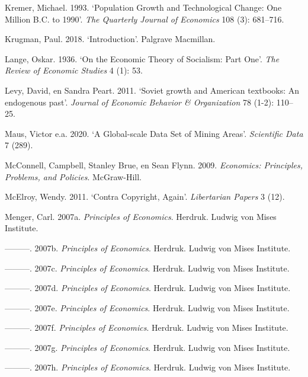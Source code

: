 \documentclass[
  a5paper,
  smalldemyvopaper,11pt,twoside,onecolumn,openright,extrafontsizes,
hidelinks]{memoir}
\newlength{\cslhangindent}
\newenvironment{CSLReferences}[2] %
 {\begin{list}{}{%
  \setlength{\itemindent}{0pt}
  \setlength{\leftmargin}{0pt}
  \setlength{\parsep}{0pt}
  \ifodd #1
   \setlength{\leftmargin}{\cslhangindent}
   \setlength{\itemindent}{-1\cslhangindent}
  \fi
  \setlength{\itemsep}{#2\baselineskip}}}
 {\end{list}}
\begin{document}
\begin{CSLReferences}{1}{0}
Kremer, Michael. 1993. {`Population Growth and Technological Change: One
Million B.C. to 1990'}. \emph{The Quarterly Journal of Economics} 108
(3): 681--716.

Krugman, Paul. 2018. {`Introduction'}. Palgrave Macmillan.

Lange, Oskar. 1936. {`On the Economic Theory of Socialism: Part One'}.
\emph{The Review of Economic Studies} 4 (1): 53.

Levy, David, en Sandra Peart. 2011. {`Soviet growth and American
textbooks: An endogenous past'}. \emph{Journal of Economic Behavior \&
Organization} 78 (1-2): 110--25.

Maus, Victor e.a. 2020. {`A Global-scale Data Set of Mining Areas'}.
\emph{Scientific Data} 7 (289).

McConnell, Campbell, Stanley Brue, en Sean Flynn. 2009. \emph{Economics:
Principles, Problems, and Policies}. McGraw-Hill.

McElroy, Wendy. 2011. {`Contra Copyright, Again'}. \emph{Libertarian
Papers} 3 (12).

Menger, Carl. 2007a. \emph{Principles of Economics}. Herdruk. Ludwig von
Mises Institute.

---------. 2007b. \emph{Principles of Economics}. Herdruk. Ludwig von
Mises Institute.

---------. 2007c. \emph{Principles of Economics}. Herdruk. Ludwig von
Mises Institute.

---------. 2007d. \emph{Principles of Economics}. Herdruk. Ludwig von
Mises Institute.

---------. 2007e. \emph{Principles of Economics}. Herdruk. Ludwig von
Mises Institute.

---------. 2007f. \emph{Principles of Economics}. Herdruk. Ludwig von
Mises Institute.

---------. 2007g. \emph{Principles of Economics}. Herdruk. Ludwig von
Mises Institute.

---------. 2007h. \emph{Principles of Economics}. Herdruk. Ludwig von
Mises Institute.


\end{CSLReferences}
\end{document}
